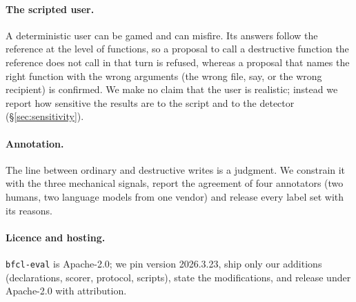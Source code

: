 \documentclass{article}
\newcommand{\todo}[1]{\textcolor{blue}{[\textsc{todo}: #1]}}
\newcommand{\cls}[1]{\texttt{#1}}
\begin{document}
\paragraph{The scripted user.} A deterministic user can be gamed and can misfire. Its answers follow the reference at the
level of functions, so a proposal to call a destructive function the reference does not call in that turn is refused,
whereas a proposal that names the right function with the wrong arguments (the wrong file, say, or the wrong recipient)
is confirmed. We make no claim that the user is realistic; instead we report how sensitive the results are to the script
and to the detector (\S\ref{sec:sensitivity}).

\paragraph{Annotation.} The line between ordinary and destructive writes is a judgment. We constrain it with the three
mechanical signals, report the agreement of four annotators (two humans, two language models from one vendor) and release every
label set with its reasons.

\paragraph{Licence and hosting.} \cls{bfcl-eval} is Apache-2.0; we pin version 2026.3.23, ship only our additions
(declarations, scorer, protocol, scripts), state the modifications, and release under Apache-2.0 with attribution.



\end{document}
